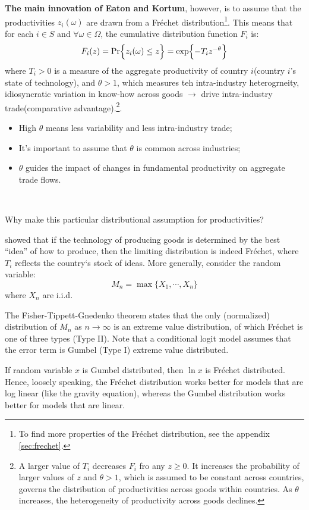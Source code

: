 \textbf{The main innovation of Eaton and Kortum}, however, is to assume that the productivities $z_i(\omega)$ are drawn from a Fréchet distribution\footnote{To find more properties of the Fréchet distribution, see the appendix \ref{sec:frechet}.}.
This means that for each $i \in S$ and $\forall \omega \in \Omega$, the cumulative distribution function $F_i$ is:
\[
F_i(z) = \operatorname{Pr}\Bigl\{z_i(\omega) \leq z \Bigr\} = \exp \Bigl\{-T_i z^{-\theta} \Bigr\}
\]
where $T_i > 0$ is a measure of the aggregate productivity of country $i$(country $i$'s state of technology), and $\theta>1$, 
which measures teh intra-industry heterogrneity, idiosyncratic variation in know-how across goods $\rightarrow$ drive intra-industry trade(comparative advantage).\footnote{A larger value of $T_i$ decreases $F_i$ fro any $z\geq 0$. It increases the probability of larger values
of $z$ and $\theta>1$, which is assumed to be constant across countries, governs the distribution of productivities across goods within countries. As $\theta$ increases, the heterogeneity of productivity across goods declines.}.
\begin{itemize}
    \item High $\theta$ means less variability and less intra-industry trade;
    \item It's important to assume that $\theta$ is common across industries;
    \item $\theta$ guides the impact of changes in fundamental productivity on aggregate trade flows.
\end{itemize}


\begin{note}
    \

    Why make this particular distributional assumption for productivities?

    \cite{kortum1997research} showed that if the technology of producing goods is determined by
    the best ``idea'' of how to produce, then the limiting distribution is indeed Fréchet, where
    $T_i$ reflects the country`s stock of ideas. More generally, consider the random variable:
    \[
    M_n = \max \{X_1, \cdots, X_n \}
    \]
    where $X_n$ are i.i.d.

    The Fisher-Tippett-Gnedenko theorem states that the only (normalized) distribution of
    $M_n$ as $n \to \infty $ is an extreme value distribution, of which Fréchet is one of three types (Type II).
    Note that a conditional logit model assumes that the error term is Gumbel (Type I) extreme value distributed.

    If random variable $x$ is Gumbel distributed, then $\ln{x}$ is Fréchet distributed. Hence, loosely speaking,
    the Fréchet distribution works better for models that are log linear (like the gravity equation), whereas the Gumbel
    distribution works better for models that are linear.
\end{note}


